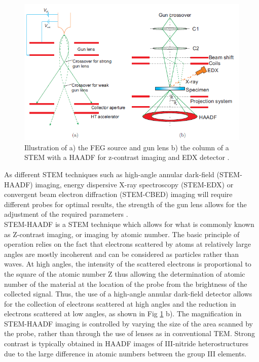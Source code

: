 \begin{figure}[!ht]
	\centering
	\includegraphics[width=1\textwidth]{Figs/Ch2/STEM}
	\caption[h] {Illustration of a) the FEG source and gun lens b) the column of a STEM with a HAADF for z-contrast imaging and EDX detector \cite{Zhang2008}.}
	\label{STEM}
\end{figure}
\FloatBarrier

As different STEM techniques such as high-angle annular dark-field (STEM-HAADF) imaging, energy dispersive X-ray spectroscopy (STEM-EDX) or convergent beam electron diffraction (STEM-CBED) imaging will require different probes for optimal results, the strength of the gun lens allows for the adjustment of the required parameters \cite{DavidB.Williams2009}.\\
STEM-HAADF is a STEM technique which allows for what is commonly known as Z-contrast imaging, or imaging by atomic number. The basic principle of operation relies on the fact that electrons scattered by atoms at relatively large angles are mostly incoherent and can be considered as particles rather than waves. At high angles, the intensity of the scattered electrons is proportional to the square of the atomic number Z \cite{Howie1979} thus allowing the determination of atomic number of the material at the location of the probe from the brightness of the collected signal. Thus, the use of a high-angle annular dark-field detector allows for the collection of electrons scattered at high angles and the reduction in electrons scattered at low angles, as shown in Fig \ref{STEM} b). The magnification in STEM-HAADF imaging
is controlled by varying the size of the area scanned by the probe, rather than through the use of lenses as in conventional TEM. Strong contrast is typically obtained in HAADF images of III-nitride heterostructures due to the large difference in atomic numbers between the group III elements.

